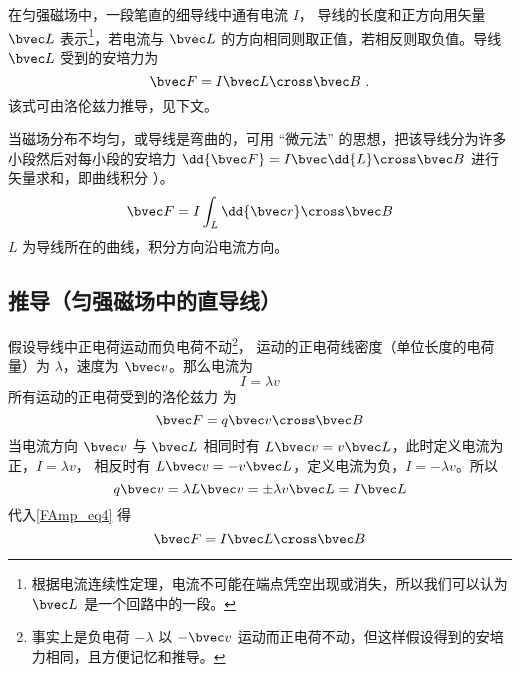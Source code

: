 

在匀强磁场中，一段笔直的细导线中通有电流 $I$， 导线的长度和正方向用矢量 $\bvec L$ 表示\footnote{根据电流连续性定理，电流不可能在端点凭空出现或消失，所以我们可以认为 $\bvec L$ 是一个回路中的一段。}，若电流与 $\bvec L$ 的方向相同则取正值，若相反则取负值。导线 $\bvec L$ 受到的安培力为
\begin{equation}\label{FAmp_eq1}
\bvec F = I \bvec L \cross \bvec B~.
\end{equation}
该式可由洛伦兹力推导，见下文。

当磁场分布不均匀，或导线是弯曲的，可用 “微元法” 的思想，把该导线分为许多小段然后对每小段的安培力 $\dd{\bvec F} = I\bvec \dd{L} \cross\bvec B$ 进行矢量求和，即曲线积分%
）。
\begin{equation}
\bvec F = I\int_L \dd{\bvec r} \cross \bvec B
\end{equation}
$L$ 为导线所在的曲线，积分方向沿电流方向。

\subsection{推导（匀强磁场中的直导线）}
假设导线中正电荷运动而负电荷不动\footnote{事实上是负电荷 $-\lambda$ 以 $-\bvec v$ 运动而正电荷不动，但这样假设得到的安培力相同，且方便记忆和推导。}， 运动的正电荷线密度（单位长度的电荷量）为 $\lambda$，速度为 $\bvec v$。那么电流为%
\begin{equation}
I = \lambda v
\end{equation}
所有运动的正电荷受到的洛伦兹力%
为
\begin{equation}\label{FAmp_eq4}
\bvec F =  q\bvec v \cross \bvec B
\end{equation}
当电流方向 $\bvec v$ 与 $\bvec L$ 相同时有 $L \bvec v = v \bvec L$，此时定义电流为正，$I = \lambda v$， 相反时有 $L \bvec v = -v\bvec L$，定义电流为负，$I = -\lambda v$。所以
\begin{equation}
q\bvec v = \lambda L \bvec v = \pm \lambda v\bvec L= I \bvec L
\end{equation}
代入\autoref{FAmp_eq4} 得
\begin{equation}
\bvec F = I \bvec L \cross \bvec B
\end{equation}
